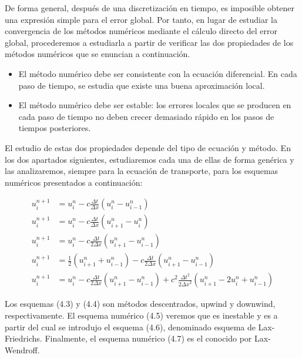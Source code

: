 De forma general, después de una discretización en tiempo, es
imposible obtener una expresión simple para el error global.
Por tanto, en lugar de estudiar la convergencia de los métodos
numéricos mediante el cálculo directo del error global, procederemos
a estudiarla a partir de verificar las dos propiedades de los métodos
numéricos que se enuncian a continuación.

\begin{itemize}
  \item

        El método numérico debe ser consistente con la ecuación
        diferencial.
        En cada paso de tiempo, se estudia que existe una buena
        aproximación local.

  \item

        El método numérico debe ser estable: los errores locales
        que se producen en cada paso de tiempo no deben crecer
        demasiado rápido en los pasos de tiempos posteriores.
\end{itemize}


El estudio de estas dos propiedades depende del tipo de ecuación y
método.
En los dos apartados siguientes, estudiaremos cada una de ellas de
forma genérica y las analizaremos, siempre para la ecuación de
transporte, para los esquemas numéricos presentados a continuación:

\begin{align}
  u^{n+1}_{i} & =
  u^{n}_{i}-
  c\frac{\Delta t}{\Delta x}
  \left(
  u^{n}_{i}-
  u^{n}_{i-1}
  \right)         \\
  u^{n+1}_{i} & =
  u^{n}_{i}-
  c\frac{\Delta t}{\Delta x}
  \left(
  u^{n}_{i+1}-
  u^{n}_{i}
  \right)         \\
  u^{n+1}_{i} & =
  u^{n}_{i}-
  c\frac{\Delta t}{2\Delta x}
  \left(
  u^{n}_{i+1}-u^{n}_{i-1}
  \right)         \\
  u^{n+1}_{i} & =
  \frac{1}{2}
  \left(
  u^{n}_{i+1}+
  u^{n}_{i-1}
  \right)-
  c\frac{\Delta t}{2\Delta x}
  \left(
  u^{n}_{i+1}-
  u^{n}_{i-1}
  \right)         \\
  u^{n+1}_{i} & =
  u^{n}_{i}-
  c\frac{\Delta t}{2\Delta x}
  \left(
  u^{n}_{i+1}-
  u^{n}_{i-1}
  \right)+
  c^{2}
  \frac{{\Delta t}^{2}}{2{\Delta x}^{2}}
  \left(
  u^{n}_{i+1}-
  2u^{n}_{i}+
  u^{n}_{i-1}
  \right)
\end{align}

Los esquemas (4.3) y (4.4) son métodos descentrados, upwind y
downwind, respectivamente.
El esquema numérico (4.5) veremos que es inestable y es a partir del
cual se introdujo el esquema (4.6), denominado esquema de
Lax-Friedrichs.
Finalmente, el esquema numérico (4.7) es el conocido por
Lax-Wendroff.

